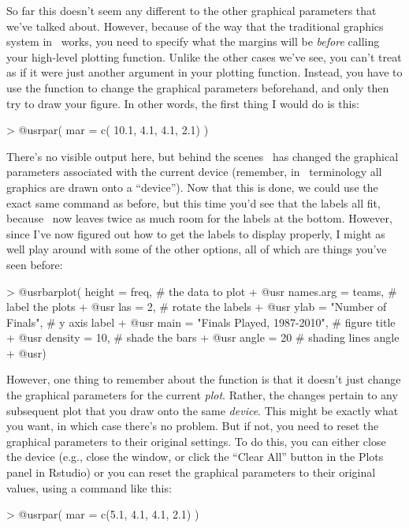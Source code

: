 So far this doesn't seem any different to the other graphical parameters that we've talked about. However, because of the way that the traditional graphics system in \R\ works, you need to specify what the margins will be {\it before} calling your high-level plotting function. Unlike the other cases we've see, you can't treat  as if it were just another argument in your plotting function. Instead, you have to use the  function to change the graphical parameters beforehand, and only then try to draw your figure. In other words, the first thing I would do is this:
\begin{rblock1} 
> @usr{par( mar = c( 10.1, 4.1, 4.1, 2.1) )}
\end{rblock1}
There's no visible output here, but behind the scenes \R\ has changed the graphical parameters associated with the current device (remember, in \R\ terminology all graphics are drawn onto a ``device''). Now that this is done, we could use the exact same command as before, but this time you'd see that the labels all fit, because \R\ now leaves twice as much room for the labels at the bottom. However, since I've now figured out how to get the labels to display properly, I might as well play around with some of the other options, all of which are things you've seen before:
\begin{rblock1}
> @usr{barplot( height = freq,}                      # the data to plot 
+ @usr{         names.arg = teams,}                  # label the plots
+ @usr{         las = 2, }                           # rotate the labels
+ @usr{         ylab = "Number of Finals", }         # y axis label
+ @usr{         main = "Finals Played, 1987-2010",}  # figure title
+ @usr{         density = 10, }                      # shade the bars
+ @usr{         angle = 20}                          # shading lines angle
+ @usr{)}
\end{rblock1}
However, one thing to remember about the  function is that it doesn't just change the graphical parameters for the current {\it plot}. Rather, the changes pertain to any subsequent plot that you draw onto the same {\it device}. This might be exactly what you want, in which case there's no problem. But if not, you need to reset the graphical parameters to their original settings. To do this, you can either close the device (e.g., close the window, or click the ``Clear All'' button in the Plots panel in Rstudio) or you can reset the graphical parameters to their original values, using a command like this:
\begin{rblock1}
> @usr{par( mar = c(5.1, 4.1, 4.1, 2.1) )}
\end{rblock1}


